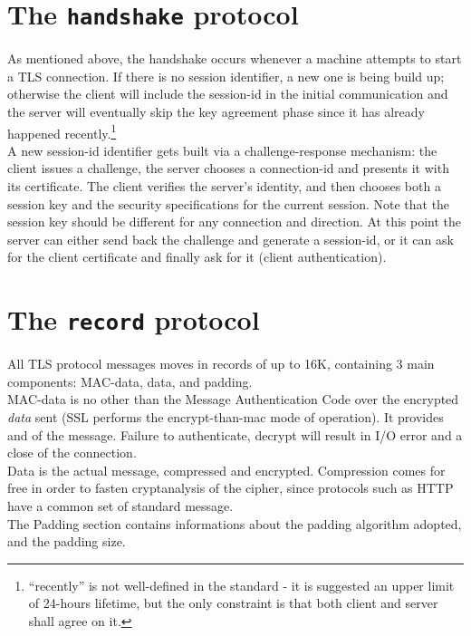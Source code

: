 \section{The \texttt{handshake} protocol}
As mentioned above, the handshake occurs whenever a machine attempts to start
a TLS connection. If there is no session identifier, a new one is being build
up; otherwise the client will include the session-id in the initial
communication and the server will eventually skip the key agreement phase since
it has already happened recently.\footnote{``recently'' is not well-defined in
  the standard - it is suggested an upper limit of 24-hours lifetime, but the
  only constraint is that both client and server shall agree on it.}\\
A new session-id identifier gets built via a challenge-response mechanism: the
client issues a challenge, the server chooses a connection-id and presents it
with its certificate. The client verifies the server's identity, and then
chooses both a session key and the security specifications for the current
session. Note that the session key should be different for any connection and
direction. At this point the server can either send back the challenge and
generate a session-id, or it can ask for the client
certificate and finally ask for it (client authentication).

\vfill
\section{The \texttt{record} protocol}
All TLS protocol messages moves in records of up to 16K, containing 3
main components: MAC-data, data, and padding.
\\
{MAC-data} is no other than the Message Authentication Code over the
encrypted \emph{data} sent
(SSL performs the encrypt-than-mac mode of operation).
It provides  and  of the message.
Failure to authenticate, decrypt will result in I/O error and a close of the
connection.
\\
{Data} is the actual message, compressed and encrypted. Compression comes
for free in order to fasten cryptanalysis of the cipher, since protocols such
as HTTP have a common set of standard message.
\\
The {Padding} section contains informations about the padding algorithm
adopted, and the padding size.

